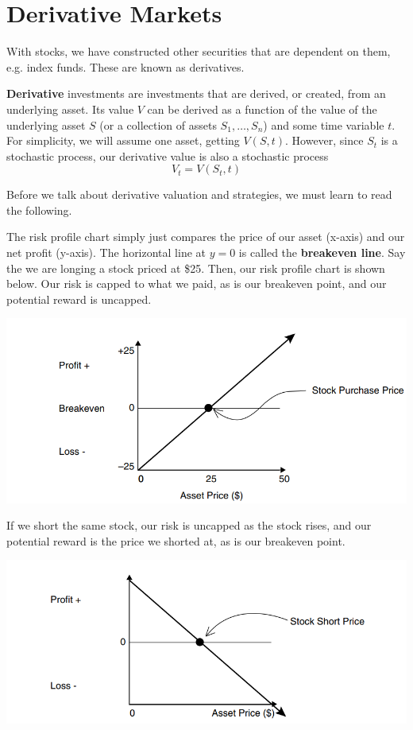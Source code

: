 \documentclass{article}
\begin{document}
\section{Derivative Markets}

With stocks, we have constructed other securities that are dependent on them, e.g. index funds. These are known as derivatives. 

\begin{definition}[Derivatives]
\textbf{Derivative} investments are investments that are derived, or created, from an underlying asset. Its value $V$ can be derived as a function of the value of the underlying asset $S$ (or a collection of assets $S_1, \ldots, S_n$) and some time variable $t$. For simplicity, we will assume one asset, getting $V(S, t)$. However, since $S_t$ is a stochastic process, our derivative value is also a stochastic process 
\[V_t = V (S_t, t)\]
\end{definition}

Before we talk about derivative valuation and strategies, we must learn to read the following. 

\begin{definition} 
The risk profile chart simply just compares the price of our asset (x-axis) and our net profit (y-axis). The horizontal line at $y = 0$ is called the \textbf{breakeven line}. Say the we are longing a stock priced at \$25. Then, our risk profile chart is shown below. Our risk is capped to what we paid, as is our breakeven point, and our potential reward is uncapped. 
\begin{center}
    \includegraphics[scale=0.3]{img/risk_long_stock.png}
\end{center}
If we short the same stock, our risk is uncapped as the stock rises, and our potential reward is the price we shorted at, as is our breakeven point. 
\begin{center}
    \includegraphics[scale=0.3]{img/risk_short_stock.png}
\end{center}
\end{definition}
\end{document}
